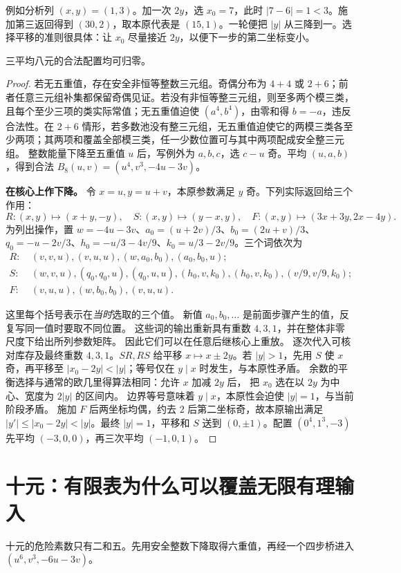 例如分析列 $(x,y)=(1,3)$。加一次 $2y$，选 $x_0=7$，此时 $|7-6|=1<3$。施加第三返回得到 $(30,2)$，取本原代表是 $(15,1)$。一轮便把 $|y|$ 从三降到一。选择平移的准则很具体：让 $x_0$ 尽量接近 $2y$，以便下一步的第二坐标变小。
\begin{lemma}[三平均八元的欧几里得下降]\label{lem:eight}
三平均八元的合法配置均可归零。
\end{lemma}
\begin{proof}
若无五重值，存在安全非恒等整数三元组。奇偶分布为 $4+4$ 或 $2+6$；前者任意三元组补集都保留奇偶见证。若没有非恒等整三元组，则至多两个模三类，且每个至少三项的类实际常值；无五重值迫使 $(a^4,b^4)$，由零和得 $b=-a$，违反合法性。在 $2+6$ 情形，若多数池没有整三元组，无五重值迫使它的两模三类各至少两项；其两项和覆盖全部模三类，任一少数位置可与其中两项配成安全整三元组。
整数能量下降至五重值 $u$ 后，写例外为 $a,b,c$，选 $c-u$ 奇。平均 $(u,a,b)$，得到合法 $B_8(u,v)=(u^4,v^3,-4u-3v)$。

\par\noindent\textbf{在核心上作下降。}
令 $x=u,y=u+v$，本原参数满足 $y$ 奇。下列实际返回给三个作用：
\[
R:(x,y)\mapsto(x+y,-y),\quad
S:(x,y)\mapsto(y-x,y),\quad
F:(x,y)\mapsto(3x+3y,2x-4y).
\]
为列出操作，置 $w=-4u-3v$、$a_0=(u+2v)/3$、$b_0=(2u+v)/3$、$q_0=-u-2v/3$、$h_0=-u/3-4v/9$、$k_0=u/3-2v/9$。三个词依次为
\begin{align*}
R:&\ (v,v,u),(v,u,u),(w,a_0,b_0),(a_0,b_0,u);\\
S:&\ (w,v,u),(q_0,q_0,u),(q_0,u,u),
(h_0,v,k_0),(h_0,v,k_0),(v/9,v/9,k_0);\\
F:&\ (v,u,u),(w,b_0,b_0),(v,u,u).
\end{align*}

这里每个括号表示在\emph{当时}选取的三个值。
新值 $a_0,b_0,\ldots$ 是前面步骤产生的值，反复写同一值时要取不同位置。
这些词的输出重新具有重数 $4,3,1$，并在整体非零尺度下给出所列参数矩阵。
因此它们可以在任意后继核心上重放。
逐次代入可核对库存及最终重数 $4,3,1$。$SR,RS$ 给平移 $x\mapsto x\pm2y$。若 $|y|>1$，先用 $S$ 使 $x$ 奇，再平移至 $|x_0-2y|<|y|$；等号仅在 $y\mid x$ 时发生，与本原性矛盾。
余数的平衡选择与通常的欧几里得算法相同：允许 $x$ 加减 $2y$ 后，
把 $x_0$ 选在以 $2y$ 为中心、宽度为 $2|y|$ 的区间内。
边界等号意味着 $y\mid x$，本原性会迫使 $|y|=1$，与当前阶段矛盾。
施加 $F$ 后两坐标均偶，约去 $2$ 后第二坐标奇，故本原输出满足 $|y'|\le|x_0-2y|<|y|$。最终 $|y|=1$，平移和 $S$ 送到 $(0,\pm1)$。配置 $(0^4,1^3,-3)$ 先平均 $(-3,0,0)$，再三次平均 $(-1,0,1)$。
\end{proof}

\section{十元：有限表为什么可以覆盖无限有理输入}
十元的危险素数只有二和五。先用安全整数下降取得六重值，再经一个四步桥进入 $(u^6,v^3,-6u-3v)$。

